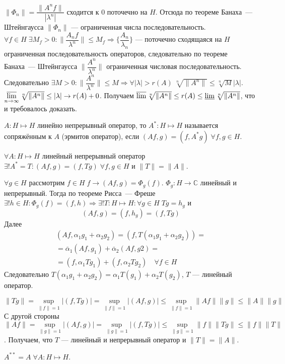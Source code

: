 \documentclass[14pt]{extarticle}
\begin{document}
\begin{Proof}
    $\|\Phi_n\| = \dfrac {\|A^n f\|}{|\lambda^n|}$ сходится к 0 поточечно на $H$.
    Отсюда по теореме Банаха~--- Штейнгаусса $\|\Phi_n\|$ --- ограниченная числа последовательность. $\forall f \in H\;\exists M_f > 0\colon \|\dfrac{A_n f}{\lambda^n}\|
    \le M_f \Rightarrow \{\dfrac{A_n}{\lambda_n}\}$ --- поточечно сходящаяся на $H$ ограниченная последовательность операторов, следовательно
    по теореме Банаха~--- Штейнгаусса $\|\dfrac{A^n}{\lambda^n}\|$ ограниченная числовая последовательность.
    Следовательно $\exists M>0\colon \|\dfrac{A^n}{\lambda^n}\| \le M \Rightarrow \forall |\lambda| > r(A)\;\sqrt[n]{\|A^n\|} \le \sqrt[n]{M}|\lambda|$.
    $\varlimsup\limits_{n \to \infty} \sqrt[n]{\|A^n\|} \le |\lambda| \to r(A) + 0$.
    Получаем $\varlimsup\sqrt[n]{\|A^n\|} \le r(A) \le \varliminf\sqrt[n]{\|A^n\|}$, что и требовалось доказать.
\end{Proof}

\begin{Opr}
    $A : H \mapsto H$ линейно непрерывный оператор, то $A^* : H \mapsto H$ называется сопряжённым к $A$ (эрмитов оператор),
    если $(Af, g) = (f, A^* g)\;\forall f, g \in H$.
\end{Opr}

\begin{Utv}
    $\forall A : H \mapsto H$ линейный непрерывный оператор $\exists! A^* = T\colon (Af, g) = (f, Tg)\;\forall f, g \in H$ и $\|T\| = \|A\|$.
\end{Utv}
\begin{Proof}
    $\forall g \in H$ рассмотрим $f \in H\;f \to (Af, g) = \Phi_g(f)$.
    $\Phi_g : H \to \mathbb C$ линейный и непрерывный.
    Тогда по теореме Рисса~--- Фреше $\exists! h \in H\colon \Phi_g(f) = (f, h) \Rightarrow \exists! T : H \mapsto H\colon \forall g \in H\;Tg = h_g$ и
    $$
    (Af, g) = (f, h_g) = (f, Tg)
    $$
    Далее 
    \begin{multline*}
    (Af, \alpha_1 g_1 + \alpha_2 g_2) = (f, T(\alpha_1 g_1 + \alpha_2 g_2)) =\\ 
    = \overline{\alpha}_1 (Af, g_1) + \overline{\alpha}_2 (Af, g2) =\\
    = (f, \alpha_1 Tg_1) + (f, \alpha_2 Tg_2)\quad \forall f \in H
    \end{multline*}
    Следовательно $T(\alpha_1 g_1 + \alpha_2 g_2) = \alpha_1 T(g_1) + \alpha_2 T(g_2)$, $T$ --- линейный оператор.
    
 $$
 \|Tg\| = \sup\limits_{\|f\| = 1}|(f, Tg)| = \sup\limits_{\|f\| = 1}|(Af, g)| \le \sup\limits_{\|f\| = 1}\|Af\|\|g\| \le \|A\|\|g\|
 $$
    С другой стороны 
    $$
    \|Af\| = \sup\limits_{\|g\| = 1}|(Af, g)| = \sup\limits_{\|g\| = 1}|(f, Tg)| \le \sup\limits_{\|g\| = 1} \|f\| \|Tg\| \le \|f\| \|T\|
    $$.
    Получаем, что $T$ --- линейный и непрерывный оператор и $\|T\| = \|A\|$.
\end{Proof}
\begin{Upr}
    $A^{**} = A\;\forall A : H \mapsto H$.
\end{Upr}
\end{document}
